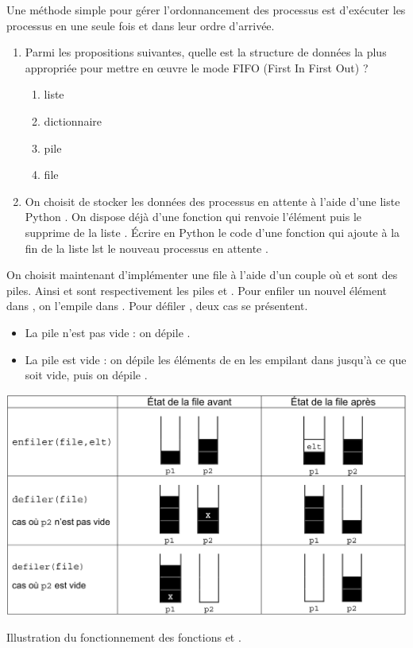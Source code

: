 \documentclass[11pt,a4paper,french,twoside]{PMCours}
\begin{document}
\medskip
Une méthode simple pour gérer l'ordonnancement des processus est d'exécuter les processus
en une seule fois et dans leur ordre d'arrivée.
\begin{enumerate}
\item Parmi les propositions suivantes, quelle est la structure de données la plus appropriée pour
mettre en œuvre le mode FIFO (First In First Out) ?
\begin{enumerate}
\item liste
\item dictionnaire
\item pile
\item file
\end{enumerate}
\item On choisit de stocker les données des processus en attente à l'aide d'une liste Python .
On dispose déjà d'une fonction  qui renvoie l'élément  puis le
supprime de la liste . Écrire en Python le code d'une fonction  qui
ajoute à la fin de la liste lst le nouveau processus en attente .
\end{enumerate}

On choisit maintenant d'implémenter une file  à l'aide d'un couple  où  et 
sont des piles. Ainsi  et  sont respectivement les piles  et .
Pour enfiler un nouvel élément  dans , on l'empile dans .
Pour défiler , deux cas se présentent.
\begin{itemize}
    \item La pile  n'est pas vide : on dépile .
    \item La pile  est vide : on dépile les éléments de  en les empilant dans  jusqu'à ce
    que  soit vide, puis on dépile .
\end{itemize}
\begin{center}
    \includegraphics[width=\textwidth]{BacBlanc2Sujet2_NSI2122-img1.png}
    
    Illustration du fonctionnement des fonctions  et .
\end{center}
\end{document}
